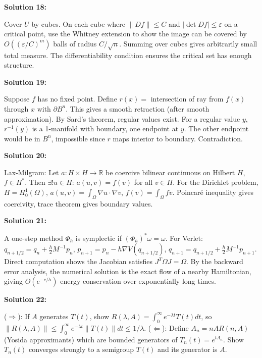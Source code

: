 \documentclass[12pt,a4paper]{exam}
\begin{document}
\vspace{0.5cm}

\textbf{Solution 18:}

Cover $U$ by cubes. On each cube where $\|Df\| \leq C$ and $|\det Df| \leq \varepsilon$ on a critical point, use the Whitney extension to show the image can be covered by $O((\varepsilon/C)^{m})$ balls of radius $C/\sqrt{n}$. Summing over cubes gives arbitrarily small total measure. The differentiability condition ensures the critical set has enough structure.

\vspace{0.5cm}

\textbf{Solution 19:}

Suppose $f$ has no fixed point. Define $r(x) =$ intersection of ray from $f(x)$ through $x$ with $\partial B^n$. This gives a smooth retraction (after smooth approximation). By Sard's theorem, regular values exist. For a regular value $y$, $r^{-1}(y)$ is a 1-manifold with boundary, one endpoint at $y$. The other endpoint would be in $B^n$, impossible since $r$ maps interior to boundary. Contradiction.

\vspace{0.5cm}

\textbf{Solution 20:}

Lax-Milgram: Let $a: H \times H \to \mathbb{R}$ be coercive bilinear continuous on Hilbert $H$, $f \in H^*$. Then $\exists! u \in H$: $a(u,v) = f(v)$ for all $v \in H$. For the Dirichlet problem, $H = H_0^1(\Omega)$, $a(u,v) = \int_\Omega \nabla u \cdot \nabla v$, $f(v) = \int_\Omega f v$. Poincar\'e inequality gives coercivity, trace theorem gives boundary values.

\vspace{0.5cm}

\textbf{Solution 21:}

A one-step method $\Phi_h$ is symplectic if $(\Phi_h)^*\omega = \omega$. For Verlet: $q_{n+1/2} = q_n + \frac{h}{2} M^{-1} p_n$, $p_{n+1} = p_n - h \nabla V(q_{n+1/2})$, $q_{n+1} = q_{n+1/2} + \frac{h}{2} M^{-1} p_{n+1}$. Direct computation shows the Jacobian satisfies $J^T \Omega J = \Omega$. By the backward error analysis, the numerical solution is the exact flow of a nearby Hamiltonian, giving $O(e^{-c/h})$ energy conservation over exponentially long times.

\vspace{0.5cm}

\textbf{Solution 22:}

($\Rightarrow$): If $A$ generates $T(t)$, show $R(\lambda,A) = \int_0^\infty e^{-\lambda t} T(t) dt$, so $\|R(\lambda,A)\| \leq \int_0^\infty e^{-\lambda t} \|T(t)\| dt \leq 1/\lambda$. ($\Leftarrow$): Define $A_n = nAR(n,A)$ (Yosida approximants) which are bounded generators of $T_n(t) = e^{t A_n}$. Show $T_n(t)$ converges strongly to a semigroup $T(t)$ and its generator is $A$.
\end{document}
